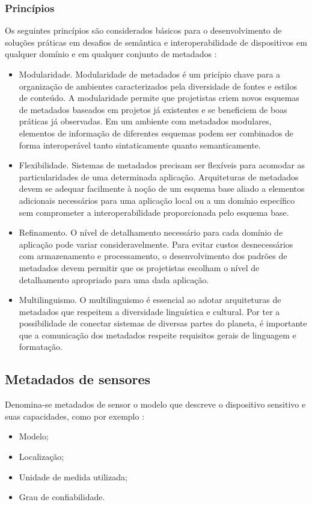 		\subsubsection{Princípios}
    \quad Os seguintes princípios são considerados básicos para o desenvolvimento de soluções práticas em desafios de semântica
    e interoperabilidade de dispositivos em qualquer domínio e em qualquer conjunto de metadados \cite{metadata}:
		\begin{itemize}
		  \item Modularidade. Modularidade de metadados é um pricípio chave para a organização de ambientes caracterizados pela diversidade de fontes e estilos
      de conteúdo. A modularidade permite que projetistas criem novos esquemas de metadados baseados em projetos
      já existentes e se beneficiem de boas práticas já observadas. Em um ambiente com metadados modulares, elementos de informação de diferentes esquemas
      podem ser combinados de forma interoperável tanto sintaticamente quanto semanticamente.
      \item Flexibilidade. Sistemas de metadados precisam ser flexíveis para acomodar as particularidades de uma determinada aplicação.
      Arquiteturas de metadados devem se adequar facilmente à noção de um esquema base aliado a elementos adicionais necessários para uma aplicação local ou a um
      domínio específico sem comprometer a interoperabilidade proporcionada pelo esquema base.
      \item Refinamento. O nível de detalhamento necessário para cada domínio de aplicação pode variar consideravelmente. Para evitar custos
      desnecessários com armazenamento e processamento, o desenvolvimento dos padrões de metadados devem permitir que os projetistas
      escolham o nível de detalhamento apropriado para uma dada aplicação.
      \item Multilinguismo. O multilinguismo é essencial ao adotar arquiteturas de metadados que respeitem a diversidade linguística e cultural.
      Por ter a possibilidade de conectar sistemas de diversas partes do planeta, é importante que a comunicação dos metadados respeite requisitos gerais de linguagem e formatação.
		\end{itemize}
  \subsection{Metadados de sensores}
    \quad Denomina-se metadados de sensor o modelo que descreve o dispositivo sensitivo e suas capacidades, como por exemplo \cite{SML}:
    \begin{itemize}
      \item Modelo;
      \item Localização;
      \item Unidade de medida utilizada;
      \item Grau de confiabilidade.
    \end{itemize}

